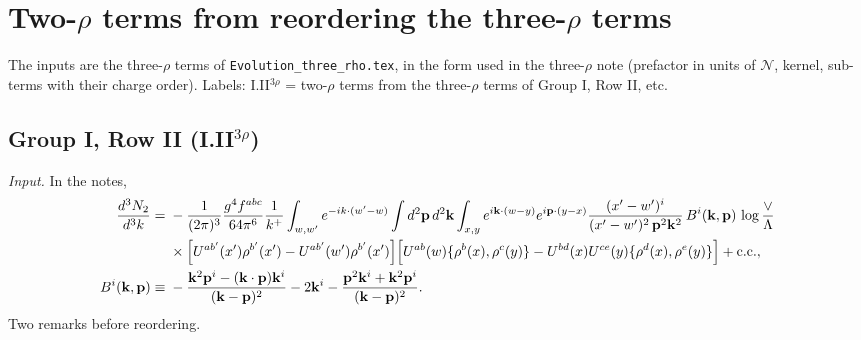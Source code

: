 \documentclass[10pt]{article}
\numberwithin{equation}{section}
\newcommand{\NN}{\mathcal N}
\begin{document}
\section{Two-\texorpdfstring{$\rho$}{rho} terms from reordering the three-\texorpdfstring{$\rho$}{rho} terms}\label{sec:three}
The inputs are the three-$\rho$ terms of \texttt{Evolution\_three\_rho.tex}, in the form used in the three-$\rho$ note (prefactor in units of $\NN$, kernel, sub-terms with their charge order). Labels: I.II$^{3\rho}$ = two-$\rho$ terms from the three-$\rho$ terms of Group I, Row II, etc.

\subsection{Group I, Row II \texorpdfstring{(I.II$^{3\rho}$)}{}}\label{src:3:I.II}
\emph{Input.} In the notes,
\begin{align*}
\frac{d^3N_2}{d^3k}={}&-\frac{1}{(2\pi)^3}\frac{g^4f^{abc}}{64\pi^6}\frac1{k^+}\int_{w,w'}e^{-ik\cdot(w'-w)}\int d^2\mathbf p\,d^2\mathbf k\int_{x,y}e^{i\mathbf k\cdot(w-y)}e^{i\mathbf p\cdot(y-x)}\frac{(x'-w')^i}{(x'-w')^2\,\mathbf p^2\mathbf k^2}\,B^i(\mathbf k,\mathbf p)\,\log\frac{\vee}{\Lambda}\\
&\times\Big[U^{ab'}(x')\rho^{b'}(x')-U^{ab'}(w')\rho^{b'}(x')\Big]\Big[U^{ab}(w)\{\rho^b(x),\rho^c(y)\}-U^{bd}(x)U^{ce}(y)\{\rho^d(x),\rho^e(y)\}\Big]+{\rm c.c.},\\
B^i(\mathbf k,\mathbf p)\equiv{}&-\frac{\mathbf k^2\mathbf p^i-(\mathbf k\cdot\mathbf p)\mathbf k^i}{(\mathbf k-\mathbf p)^2}-2\mathbf k^i-\frac{\mathbf p^2\mathbf k^i+\mathbf k^2\mathbf p^i}{(\mathbf k-\mathbf p)^2}.
\end{align*}
Two remarks before reordering.
\end{document}
